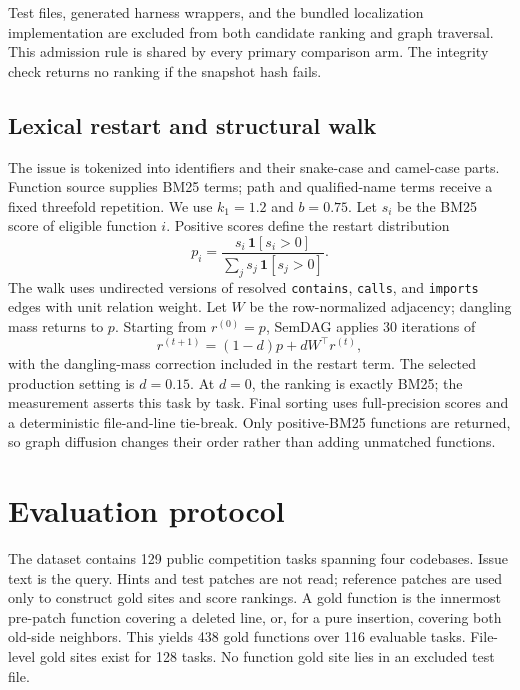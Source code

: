 \documentclass[11pt]{article}
\begin{document}
Test files, generated harness wrappers, and the bundled localization implementation are excluded from both candidate ranking and graph traversal. This admission rule is shared by every primary comparison arm. The integrity check returns no ranking if the snapshot hash fails.

\subsection{Lexical restart and structural walk}
The issue is tokenized into identifiers and their snake-case and camel-case parts. Function source supplies BM25 terms; path and qualified-name terms receive a fixed threefold repetition. We use $k_1=1.2$ and $b=0.75$. Let $s_i$ be the BM25 score of eligible function $i$. Positive scores define the restart distribution
\begin{equation}
 p_i = \frac{s_i\,\mathbf{1}[s_i>0]}{\sum_j s_j\,\mathbf{1}[s_j>0]}.
\end{equation}
The walk uses undirected versions of resolved \texttt{contains}, \texttt{calls}, and \texttt{imports} edges with unit relation weight. Let $W$ be the row-normalized adjacency; dangling mass returns to $p$. Starting from $r^{(0)}=p$, SemDAG applies 30 iterations of
\begin{equation}
 r^{(t+1)}=(1-d)p+dW^\top r^{(t)},
 \label{eq:walk}
\end{equation}
with the dangling-mass correction included in the restart term. The selected production setting is $d=0.15$. At $d=0$, the ranking is exactly BM25; the measurement asserts this task by task. Final sorting uses full-precision scores and a deterministic file-and-line tie-break. Only positive-BM25 functions are returned, so graph diffusion changes their order rather than adding unmatched functions.

\section{Evaluation protocol}
The dataset contains 129 public competition tasks spanning four codebases. Issue text is the query. Hints and test patches are not read; reference patches are used only to construct gold sites and score rankings. A gold function is the innermost pre-patch function covering a deleted line, or, for a pure insertion, covering both old-side neighbors. This yields 438 gold functions over 116 evaluable tasks. File-level gold sites exist for 128 tasks. No function gold site lies in an excluded test file.
\end{document}

